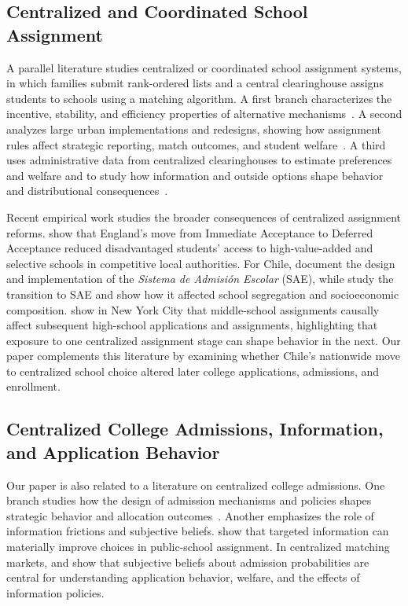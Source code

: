 \documentclass[11pt]{article}
\begin{document}
\subsection{Centralized and Coordinated School Assignment}
A parallel literature studies centralized or coordinated school assignment systems, in which families submit rank-ordered lists and a central clearinghouse assigns students to schools using a matching algorithm. A first branch characterizes the incentive, stability, and efficiency properties of alternative mechanisms~\citep{abdulkadiroglu2003,kesten2010,pathak2017}. A second analyzes large urban implementations and redesigns, showing how assignment rules affect strategic reporting, match outcomes, and student welfare~\citep{abdulkadiroglu2005,abdulkadiroglu2009,abdulkadiroglu2017}. A third uses administrative data from centralized clearinghouses to estimate preferences and welfare and to study how information and outside options shape behavior and distributional consequences~\citep{agarwal2018,arteaga2022smart,akbarpour2022}.

Recent empirical work studies the broader consequences of centralized assignment reforms. \citet{terrier2026} show that England's move from Immediate Acceptance to Deferred Acceptance reduced disadvantaged students' access to high-value-added and selective schools in competitive local authorities. For Chile, \citet{correa2021} document the design and implementation of the \emph{Sistema de Admisión Escolar} (SAE), while \citet{urzua2023} study the transition to SAE and show how it affected school segregation and socioeconomic composition. \citet{hahmpark2024} show in New York City that middle-school assignments causally affect subsequent high-school applications and assignments, highlighting that exposure to one centralized assignment stage can shape behavior in the next. Our paper complements this literature by examining whether Chile's nationwide move to centralized school choice altered later college applications, admissions, and enrollment.

\subsection{Centralized College Admissions, Information, and Application Behavior}
Our paper is also related to a literature on centralized college admissions. One branch studies how the design of admission mechanisms and policies shapes strategic behavior and allocation outcomes~\citep{chenkoesten2013,fu2014,rios2021improving,kapor2024}. Another emphasizes the role of information frictions and subjective beliefs. \citet{hastingsweinstein2008} show that targeted information can materially improve choices in public-school assignment. In centralized matching markets, \citet{kaporneilsonzimmerman2020} and \citet{larroucau2024} show that subjective beliefs about admission probabilities are central for understanding application behavior, welfare, and the effects of information policies.
\end{document}
